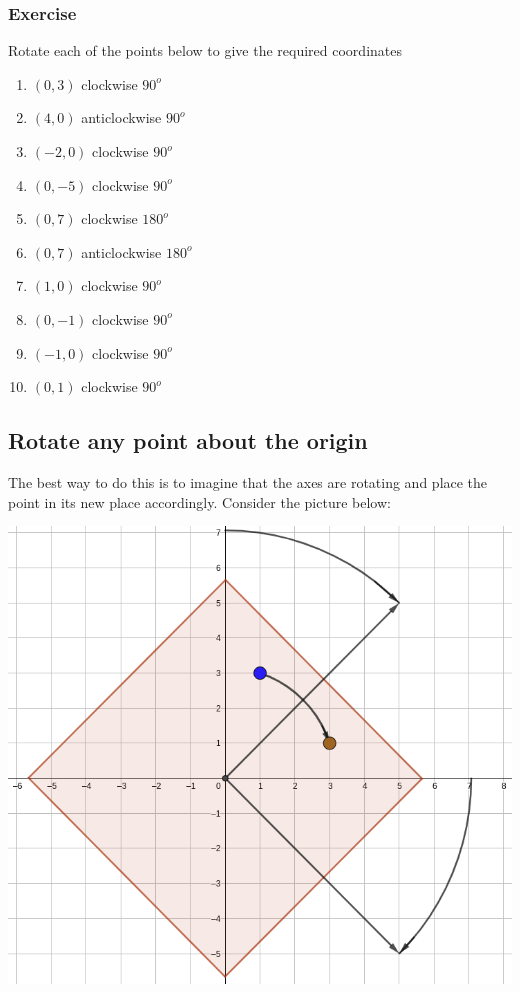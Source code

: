 \subsubsection{Exercise}
Rotate each of the points below to give the required coordinates
\begin{enumerate}
    \item $(0, 3)$ clockwise $90^o$
    \item $(4, 0)$ anticlockwise $90^o$
    \item $(-2, 0)$ clockwise $90^o$
    \item $(0, -5)$ clockwise $90^o$
    \item $(0, 7)$ clockwise $180^o$
    \item $(0, 7)$ anticlockwise $180^o$
    \item $(1, 0)$ clockwise $90^o$
    \item $(0, -1)$ clockwise $90^o$
    \item $(-1, 0)$ clockwise $90^o$
    \item $(0, 1)$ clockwise $90^o$
\end{enumerate}

\subsection{Rotate any point about the origin}
The best way to do this is to imagine that the axes are rotating and place the point in its new place accordingly.
Consider the picture below:

\bigskip

\includegraphics[scale=0.4]{./Images/Transformations/Rotation_1.png}

